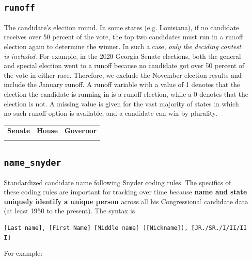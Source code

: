 \documentclass[12pt]{article}
\begin{document}
\FloatBarrier


\subsection*{\texttt{runoff}}

The candidate's election round. In some states (e.g. Louisiana), if no candidate receives over 50 percent of the vote, the top two candidates must run in a runoff election again to determine the winner.
In such a case, \emph{only the deciding contest is included}. For example, in the 2020 Georgia Senate elections, both the general and special election went to a runoff because no candidate got over 50 percent of the vote in either race. Therefore, we exclude the November election results and include the January runoff.
A runoff variable with a value of 1 denotes that the election the candidate is running in is a runoff election, while a 0 denotes that the election is not. A missing value is given for the vast majority of states in which no such runoff option is available, and a candidate can win by plurality.
\begin{table}[!h]
\begin{tabularx}{\linewidth}{CCC}
    \textbf{Senate} & \textbf{House} & \textbf{Governor}\\
     &  & 
\end{tabularx}
\end{table}


\FloatBarrier

\subsection*{\texttt{name\_snyder}}


Standardized candidate name following Snyder coding rules. The
specifics of these coding rules are important for tracking over time because
\textbf{name and state uniquely identify a unique person} across all his
Congressional candidate data (at least 1950 to the present). The syntax
is

\texttt{{[}Last\ name{]},\ {[}First\ Name{]}\ {[}Middle\ name{]}\ ({[}Nickname{]}),\ {[}JR./SR./I/II/III{]}}

For example:
\end{document}
